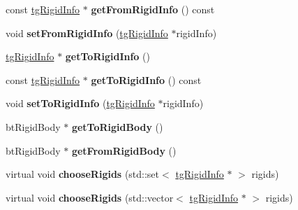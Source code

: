 \begin{DoxyCompactItemize}
\item 
\hypertarget{classtg_connector_info_aa4d1634d99c160ffdfbb6f927cdd94cd}{const \hyperlink{classtg_rigid_info}{tg\-Rigid\-Info} $\ast$ {\bfseries get\-From\-Rigid\-Info} () const }\label{classtg_connector_info_aa4d1634d99c160ffdfbb6f927cdd94cd}

\item 
\hypertarget{classtg_connector_info_a04310aef0b90090fc541ca33523e4254}{void {\bfseries set\-From\-Rigid\-Info} (\hyperlink{classtg_rigid_info}{tg\-Rigid\-Info} $\ast$rigid\-Info)}\label{classtg_connector_info_a04310aef0b90090fc541ca33523e4254}

\item 
\hypertarget{classtg_connector_info_aef4d585bd515733b8160a0899ca2f7a5}{\hyperlink{classtg_rigid_info}{tg\-Rigid\-Info} $\ast$ {\bfseries get\-To\-Rigid\-Info} ()}\label{classtg_connector_info_aef4d585bd515733b8160a0899ca2f7a5}

\item 
\hypertarget{classtg_connector_info_a90f0e0a9310321830ae3eb698316b92d}{const \hyperlink{classtg_rigid_info}{tg\-Rigid\-Info} $\ast$ {\bfseries get\-To\-Rigid\-Info} () const }\label{classtg_connector_info_a90f0e0a9310321830ae3eb698316b92d}

\item 
\hypertarget{classtg_connector_info_aa0200180014d2e36a2539b9e2b955077}{void {\bfseries set\-To\-Rigid\-Info} (\hyperlink{classtg_rigid_info}{tg\-Rigid\-Info} $\ast$rigid\-Info)}\label{classtg_connector_info_aa0200180014d2e36a2539b9e2b955077}

\item 
\hypertarget{classtg_connector_info_aa7eb43322b60e7e0ee833080e8465098}{bt\-Rigid\-Body $\ast$ {\bfseries get\-To\-Rigid\-Body} ()}\label{classtg_connector_info_aa7eb43322b60e7e0ee833080e8465098}

\item 
\hypertarget{classtg_connector_info_a81ac443e92d4fb486116c37ab75872cd}{bt\-Rigid\-Body $\ast$ {\bfseries get\-From\-Rigid\-Body} ()}\label{classtg_connector_info_a81ac443e92d4fb486116c37ab75872cd}

\item 
\hypertarget{classtg_connector_info_a3a0518a4b3be39813a993f366de70fdc}{virtual void {\bfseries choose\-Rigids} (std\-::set$<$ \hyperlink{classtg_rigid_info}{tg\-Rigid\-Info} $\ast$ $>$ rigids)}\label{classtg_connector_info_a3a0518a4b3be39813a993f366de70fdc}

\item 
\hypertarget{classtg_connector_info_a09a229040fac476ae2ad2f6e138aebe9}{virtual void {\bfseries choose\-Rigids} (std\-::vector$<$ \hyperlink{classtg_rigid_info}{tg\-Rigid\-Info} $\ast$ $>$ rigids)}\label{classtg_connector_info_a09a229040fac476ae2ad2f6e138aebe9}


\end{DoxyCompactItemize}
